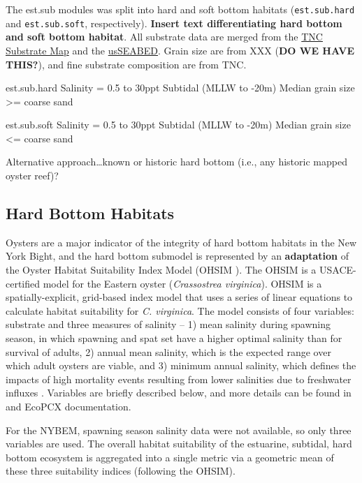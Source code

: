 \documentclass[
]{book}
\begin{document}
The est.sub modules was split into hard and soft bottom habitats (\texttt{est.sub.hard} and \texttt{est.sub.soft}, respectively). \textbf{Insert text differentiating hard bottom and soft bottom habitat}. All substrate data are merged from the \href{https://maps.coastalresilience.org/newjersey/\#}{TNC Substrate Map} and the \href{https://www.usgs.gov/programs/cmhrp/science/accessing-usseabed}{usSEABED}. Grain size are from XXX (\textbf{DO WE HAVE THIS?}), and fine substrate composition are from TNC.

est.sub.hard
Salinity = 0.5 to 30ppt
Subtidal (MLLW to -20m)
Median grain size \textgreater= coarse sand

est.sub.soft
Salinity = 0.5 to 30ppt
Subtidal (MLLW to -20m)
Median grain size \textless= coarse sand

Alternative approach\ldots known or historic hard bottom (i.e., any historic mapped oyster reef)?

\hypertarget{hard-bottom-habitats}{%
\subsection{Hard Bottom Habitats}\label{hard-bottom-habitats}}

Oysters are a major indicator of the integrity of hard bottom habitats in the New York Bight, and the hard bottom submodel is represented by an \textbf{adaptation} of the Oyster Habitat Suitability Index Model (OHSIM \citet{swannack_robust_2014}). The OHSIM is a USACE-certified model for the Eastern oyster (\emph{Crassostrea virginica}). OHSIM is a spatially-explicit, grid-based index model that uses a series of linear equations to calculate habitat suitability for \emph{C. virginica}. The model consists of four variables: substrate and three measures of salinity -- 1) mean salinity during spawning season, in which spawning and spat set have a higher optimal salinity than for survival of adults, 2) annual mean salinity, which is the expected range over which adult oysters are viable, and 3) minimum annual salinity, which defines the impacts of high mortality events resulting from lower salinities due to freshwater influxes \citep{soniat_understanding_2012}. Variables are briefly described below, and more details can be found in \citet{swannack_robust_2014} and EcoPCX documentation.

For the NYBEM, spawning season salinity data were not available, so only three variables are used. The overall habitat suitability of the estuarine, subtidal, hard bottom ecosystem is aggregated into a single metric via a geometric mean of these three suitability indices (following the OHSIM).
\end{document}
